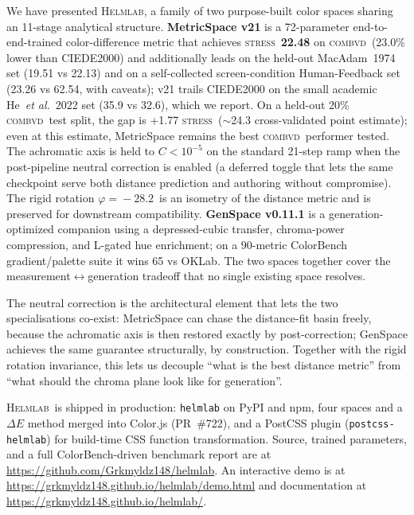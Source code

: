 \documentclass[11pt, twocolumn]{article}
\newcommand{\helmlab}{\textsc{Helmlab}}
\newcommand{\stress}{\textsc{stress}}
\newcommand{\combvd}{\textsc{combvd}}
\newcommand{\etal}{\textit{et al.}}
\begin{document}
We have presented \helmlab, a family of two purpose-built color
spaces sharing an 11-stage analytical structure. \textbf{MetricSpace
v21} is a 72-parameter end-to-end-trained color-difference metric
that achieves \stress\ \textbf{22.48} on \combvd\ (23.0\% lower than
CIEDE2000) and additionally leads on the held-out MacAdam~1974 set
(19.51 vs 22.13) and on a self-collected screen-condition
Human-Feedback set (23.26 vs 62.54, with caveats); v21 trails
CIEDE2000 on the small academic He~\etal\ 2022 set (35.9 vs 32.6),
which we report. On a held-out 20\% \combvd\ test split, the gap is
+1.77 \stress\ ($\sim$24.3 cross-validated point estimate); even at
this estimate, MetricSpace remains the best \combvd\ performer
tested. The achromatic axis is held to $C < 10^{-5}$ on the standard 21-step ramp
when the post-pipeline neutral correction is enabled (a deferred
toggle that lets the same checkpoint serve both distance prediction
and authoring without compromise). The rigid rotation
$\varphi\!=\!-28.2$\textdegree\ is an isometry of the distance
metric and is preserved for downstream compatibility.
\textbf{GenSpace v0.11.1} is a generation-optimized companion using
a depressed-cubic transfer, chroma-power compression, and L-gated
hue enrichment; on a 90-metric ColorBench gradient/palette suite
it wins 65 vs OKLab. The two spaces together cover the
measurement$\leftrightarrow$generation tradeoff that no single
existing space resolves.

The neutral correction is the architectural element that lets the
two specialisations co-exist: MetricSpace can chase the
distance-fit basin freely, because the achromatic axis is then
restored exactly by post-correction; GenSpace achieves the same
guarantee structurally, by construction. Together with the rigid
rotation invariance, this lets us decouple ``what is the best
distance metric'' from ``what should the chroma plane look like
for generation''.

\helmlab\ is shipped in production: \texttt{helmlab} on PyPI and
npm, four spaces and a $\Delta E$ method merged into Color.js
(PR~\#722), and a PostCSS plugin (\texttt{postcss-helmlab}) for
build-time CSS function transformation. Source, trained parameters,
and a full ColorBench-driven benchmark report are at
\url{https://github.com/Grkmyldz148/helmlab}. An interactive demo
is at \url{https://grkmyldz148.github.io/helmlab/demo.html} and
documentation at \url{https://grkmyldz148.github.io/helmlab/}.


\end{document}
